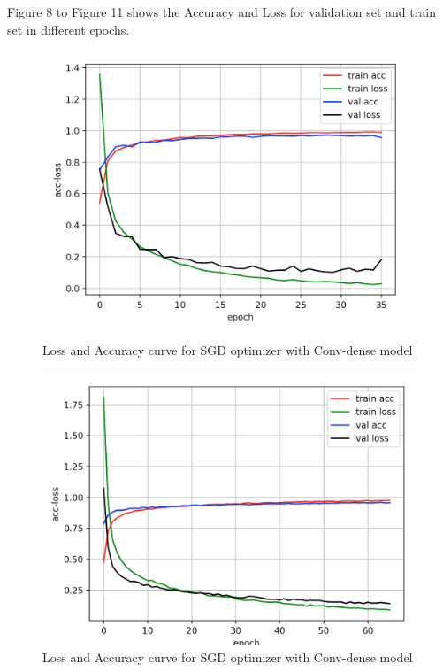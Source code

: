 \documentclass{article}
\begin{document}
Figure 8 to Figure 11 shows the Accuracy and Loss for validation set and train set in different epochs.

\begin{figure}[htbp]
\centering
\begin{minipage}[t]{0.48\textwidth}
\centering
\includegraphics[scale = 0.3]{sgd_2.png}
\caption{Loss and Accuracy curve for SGD optimizer with Conv-dense model}
\end{minipage}
\begin{minipage}[t]{0.48\textwidth}
\centering
\includegraphics[scale = 0.3]{adadelta_2.png}
\caption{Loss and Accuracy curve for SGD optimizer with Conv-dense model}
\end{minipage}
\end{figure}
\end{document}
